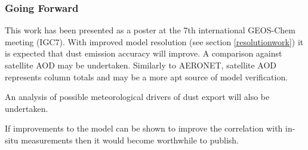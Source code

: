 \subsubsection{Going Forward}

This work has been presented as a poster at the 7th international GEOS-Chem meeting (IGC7).
With improved model resolution (see section \ref{resolutionwork}) it is expected that dust emission accuracy will improve.
A comparison against satellite AOD may be undertaken.
Similarly to AERONET, satellite AOD represents column totals and may be a more apt source of model verification.

An analysis of possible meteorological drivers of dust export will also be undertaken.

If improvements to the model can be shown to improve the correlation with in-situ measurements then it would become worthwhile to publish.